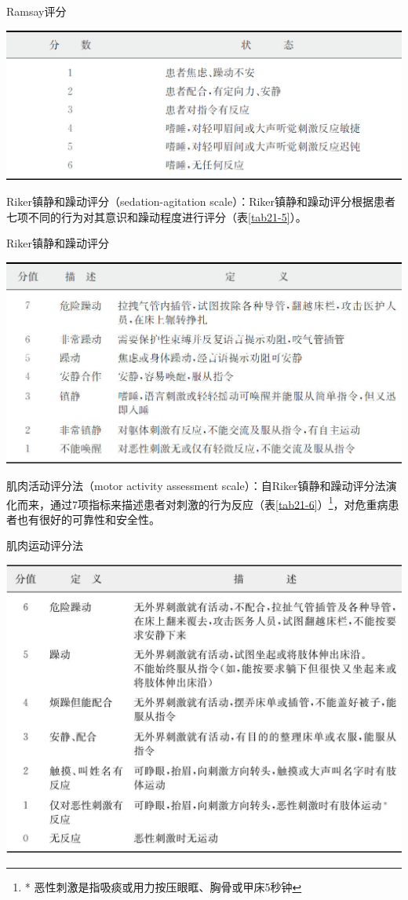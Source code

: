 \begin{table}[htbp]
\centering
\caption{Ramsay评分}
\label{tab21-4}
\includegraphics{./images/Image00232.jpg}
\end{table}

Riker镇静和躁动评分（sedation-agitation
scale）：Riker镇静和躁动评分根据患者七项不同的行为对其意识和躁动程度进行评分（表\ref{tab21-5}）。

\begin{table}[htbp]
\centering
\caption{Riker镇静和躁动评分}
\label{tab21-5}
\includegraphics{./images/Image00233.jpg}
\end{table}

肌肉活动评分法（motor activity assessment
scale）：自Riker镇静和躁动评分法演化而来，通过7项指标来描述患者对刺激的行为反应（表\ref{tab21-6}）\footnote{* 恶性刺激是指吸痰或用力按压眼眶、胸骨或甲床5秒钟}，对危重病患者也有很好的可靠性和安全性。

\begin{table}[htbp]
\centering
\caption{肌肉运动评分法}
\label{tab21-6}
\includegraphics[width=\textwidth,height=\textheight,keepaspectratio]{./images/Image00234.jpg}
\end{table}



